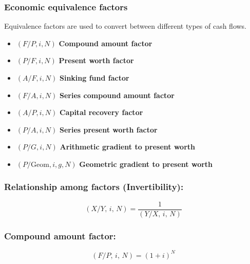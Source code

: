     \subsubsection{Economic equivalence factors}
    \begin{definition}
        Equivalence factors are used to convert between different types of cash flows. 
        \begin{itemize}
            \item \((F/P, i, N)\) \textbf{Compound amount factor}
            \item \((P/F, i, N)\) \textbf{Present worth factor}
            \item \((A/F, i, N)\) \textbf{Sinking fund factor}
            \item \((F/A, i, N)\) \textbf{Series compound amount factor}
            \item \((A/P, i, N)\) \textbf{Capital recovery factor}
            \item \((P/A, i, N)\) \textbf{Series present worth factor}
            \item $(P/G, i, N)$ \textbf{Arithmetic gradient to present worth}
            \item $(P/\text{Geom}, i, g, N)$ \textbf{Geometric gradient to present worth}
        \end{itemize}
    \end{definition}

    \subsubsection{Relationship among factors (Invertibility):}
    \begin{definition}
        \begin{equation}
            \left(X/Y, \, i, \, N\right) = \frac{1}{\left(Y/X, \, i, \, N\right)}
        \end{equation}
    \end{definition}

    \subsubsection{Compound amount factor:}
    \begin{definition}
        \begin{equation}
            \left(F/P, \, i, \, N\right) = (1+i)^N
        \end{equation}
    \end{definition}

